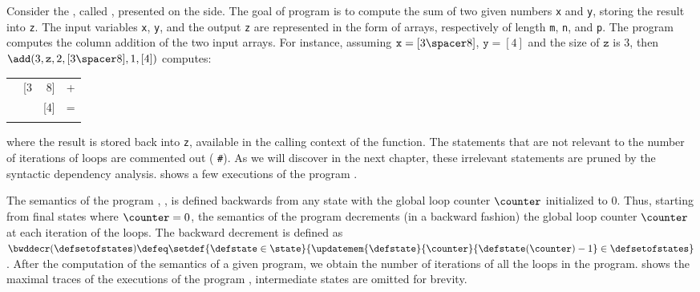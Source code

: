 \begin{example}
  Consider the , called \add{}, presented on the side.
The goal of program \add{} is to compute the sum of two given numbers \texttt{x} and \texttt{y}, storing the result into \texttt{z}.
The input variables \texttt{x}, \texttt{y}, and the output \texttt{z} are represented in the form of arrays, respectively of length \texttt{m}, \texttt{n}, and \texttt{p}.
The program \add{} computes the column addition of the two input arrays. For instance, assuming $\texttt{x} = [3\spacer 8]$, $\texttt{y} = [4]$ and the size of $\texttt{z}$ is 3, then $\add(3, \texttt{z}, 2, [3\spacer 8], 1, [4])$ computes:
\begin{center}
  \begin{tabular}{c@{\,}r@{\,}r@{\,}c}
       & [3 &  8] & + \\
       &    & [4] & = \\
    \hline
    [0 &  4 &  2] &  \\
  \end{tabular}
\end{center}
where the result is stored back into \texttt{z}, available in the calling context of the function.
The statements that are not relevant to the number of iterations of loops are commented out (\cf{} \textcolor{codecomment}{\texttt{\#}}).
As we will discover in the next chapter, these irrelevant statements are pruned by the syntactic dependency analysis.
 shows a few executions of the program \add{}.

The semantics of the program \add, \cf{} , is defined backwards from any state with the global loop counter $\counter$ initialized to $0$.
Thus, starting from final states where $\counter = 0$, the semantics of the program \add{} decrements (in a backward fashion) the global loop counter $\counter$ at each iteration of the loops. The backward decrement is defined as $\bwddecr(\defsetofstates) \defeq \setdef{\defstate \in \state}{\updatemem{\defstate}{\counter}{\defstate(\counter) - 1} \in \defsetofstates}$. After the computation of the semantics of a given program, we obtain the number of iterations of all the loops in the program.
 shows the maximal traces of the executions of the program \add{}, intermediate states are omitted for brevity.
\end{example}

